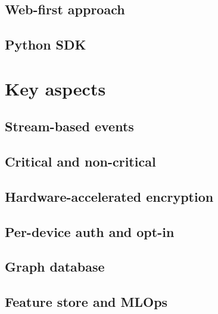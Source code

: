 \subsection{Web-first approach}
\label{chapter4-web-first-approach}

\subsection{Python SDK}
\label{chapter4-python-sdk}

\section{Key aspects}
\label{chapter4-key-aspects}

\subsection{Stream-based events}
\label{chapter4-stream-based-events}

\subsection{Critical and non-critical}
\label{chapter4-critical-and-non-critical}

\subsection{Hardware-accelerated encryption}
\label{chapter4-hardware-accelerated-encryption}

\subsection{Per-device auth and opt-in}
\label{chapter4-user-side-opt-in}

\subsection{Graph database}
\label{chapter4-graph-database}

\subsection{Feature store and MLOps}
\label{chapter4-feature-store-and-mlops}

